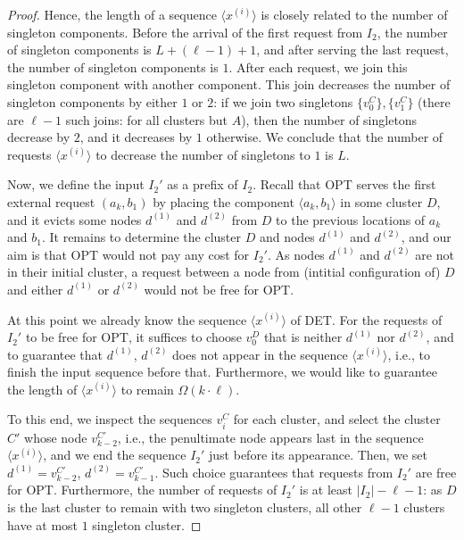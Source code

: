\begin{proof}
  Hence, the length of a sequence $\langle x^{(i)}\rangle$ is closely related to the number of singleton components.
  Before the arrival of the first request from $I_2$, the number of singleton components is $L + (\ell-1) + 1$, and after serving the last request, the number of singleton components is $1$.
  After each request, we join this singleton component with another component.
  This join decreases the number of singleton components by either $1$ or $2$: if we join two singletons $\{v^C_0\}, \{v^C_1\}$ (there are $\ell-1$ such joins: for all clusters but $A$), then the number of singletons decrease by $2$, and it decreases by $1$ otherwise.
  We conclude that the number of requests $\langle x^{(i)}\rangle$ to decrease the number of singletons to $1$ is $L$.

  \medskip

  Now, we define the input $I_2'$ as a prefix of $I_2$.
  Recall that OPT serves the first external request $(a_k, b_1)$ by placing the component $\langle a_k, b_1\rangle$ in some cluster $D$, and it evicts some nodes $d^{(1)}$ and $d^{(2)}$ from $D$ to the previous locations of $a_k$ and $b_1$.
  It remains to determine the cluster $D$ and nodes $d^{(1)}$ and $d^{(2)}$,
  and our aim is that OPT would not pay any cost for $I_2'$.
  As nodes $d^{(1)}$ and $d^{(2)}$ are not in their initial cluster, a request between a node from (intitial configuration of) $D$ and either $d^{(1)}$ or $d^{(2)}$ would not be free for OPT.
  
  
  At this point we already know the sequence $\langle x^{(i)}\rangle$ of DET.
  For the requests of $I_2'$ to be free for OPT, it suffices to choose $v^D_0$ that is neither $d^{(1)}$ nor $d^{(2)}$,
  and to guarantee that $d^{(1)}$, $d^{(2)}$ does not appear in the sequence $\langle x^{(i)}\rangle$, i.e., to finish the input sequence before that.
  Furthermore, we would like to guarantee the length of $\langle x^{(i)}\rangle$ to remain $\Omega(k\cdot \ell)$.
  
  To this end, we inspect the sequences $v^{C}_i$ for each cluster, and select the cluster $C'$ whose node $v^{C'}_{k-2}$, i.e., the penultimate node appears last in the sequence $\langle x^{(i)}\rangle$, and we end the sequence $I_2'$ just before its appearance.
  Then, we set $d^{(1)} = v^{C'}_{k-2}$, $d^{(2)} = v^{C'}_{k-1}$.
  Such choice guarantees that requests from $I_2'$ are free for OPT.
  Furthermore, the number of requests of $I_2'$ is at least $|I_2| - \ell - 1$: as $D$ is the last cluster to remain with two singleton clusters, all other $\ell-1$ clusters have at most $1$ singleton cluster.


\end{proof}
